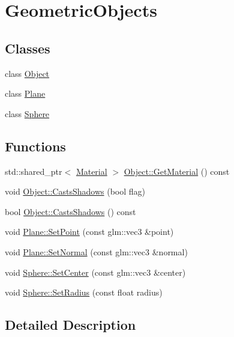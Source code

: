 \hypertarget{group___geometric_objects}{}\section{Geometric\+Objects}
\label{group___geometric_objects}
\subsection*{Classes}
\begin{DoxyCompactItemize}
\item 
class \hyperlink{class_object}{Object}
\item 
class \hyperlink{class_plane}{Plane}
\item 
class \hyperlink{class_sphere}{Sphere}
\end{DoxyCompactItemize}
\subsection*{Functions}
\begin{DoxyCompactItemize}
\item 
std\+::shared\+\_\+ptr$<$ \hyperlink{class_material}{Material} $>$ \hyperlink{group___geometric_objects_ga7ad7172879f1b2fd092561827aa2bbb1}{Object\+::\+Get\+Material} () const
\item 
void \hyperlink{group___geometric_objects_ga74fa63e74026915a261117724303adfc}{Object\+::\+Casts\+Shadows} (bool flag)
\item 
bool \hyperlink{group___geometric_objects_gab4254fb85f166245bb7234f5c5295777}{Object\+::\+Casts\+Shadows} () const
\item 
void \hyperlink{group___geometric_objects_ga8fdaa0574a2046f2e280e6c926f7947d}{Plane\+::\+Set\+Point} (const glm\+::vec3 \&point)
\item 
void \hyperlink{group___geometric_objects_ga50e8800fa3595a6b6fafcda17a77388c}{Plane\+::\+Set\+Normal} (const glm\+::vec3 \&normal)
\item 
void \hyperlink{group___geometric_objects_ga2b8aef309428ea904c75ce3300a71e09}{Sphere\+::\+Set\+Center} (const glm\+::vec3 \&center)
\item 
void \hyperlink{group___geometric_objects_ga0377e69b4a636f542c30c6fa977399e3}{Sphere\+::\+Set\+Radius} (const float radius)
\end{DoxyCompactItemize}


\subsection{Detailed Description}


